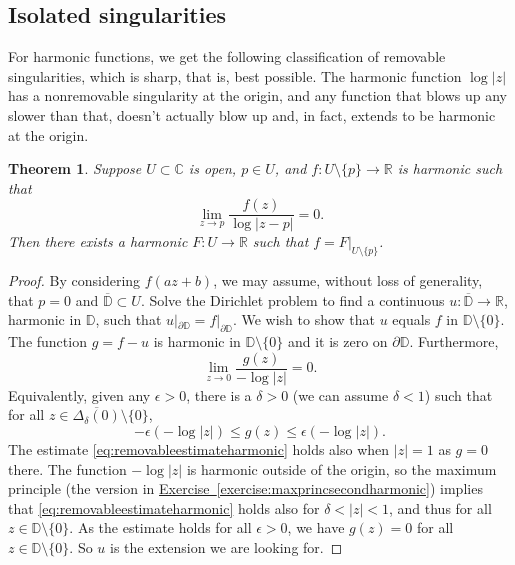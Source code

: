 \documentclass[12pt,openany]{book}
\newcommand{\sabs}[1]{\lvert {#1} \rvert}
\newcommand{\C}{{\mathbb{C}}}
\newcommand{\R}{{\mathbb{R}}}
\newcommand{\D}{{\mathbb{D}}}
\theoremstyle{plain}
\newtheorem{thm}{Theorem}[section]
\theoremstyle{remark}
\theoremstyle{definition}
\theoremstyle{exercise}
\theoremstyle{example}
\newcommand{\exerciseref}[1]{\hyperref[#1]{Exercise~\ref*{#1}}}
\begin{document}
\subsection{Isolated singularities}

For harmonic functions, we get the following classification of removable
singularities, which is sharp, that is, best possible.
The harmonic function $\log \sabs{z}$
has a nonremovable singularity at the origin, and any function
that blows up any slower than that, doesn't actually blow up and, in fact,
extends to be
harmonic at the origin.

\begin{thm}
Suppose $U \subset \C$ is open, $p \in U$, and $f \colon U \setminus \{ p \}
\to \R$ is harmonic such that
\begin{equation*}
\lim_{z\to p} \frac{f(z)}{\log \sabs{z-p}} = 0 .
\end{equation*}
Then there exists a harmonic $F \colon U \to \R$ such that
$f = F|_{U \setminus \{ p \}}$.
\end{thm}

\begin{proof}
By considering $f(a z + b)$, we may assume, without loss of generality,
that $p = 0$ and $\overline{\D} \subset U$.  Solve the Dirichlet problem
to find a continuous $u \colon \overline{\D} \to \R$,
harmonic in $\D$, such that $u|_{\partial \D} = f|_{\partial \D}$.
We wish to show that $u$ equals $f$ in $\D \setminus \{0\}$.
The function
$g = f - u$ is harmonic in $\D \setminus \{ 0 \}$ and it is zero on
$\partial \D$.  Furthermore,
\begin{equation*}
\lim_{z \to 0} \frac{g(z)}{-\log \sabs{z}} = 0.
\end{equation*}
Equivalently, given any $\epsilon > 0$, there is a $\delta > 0$
(we can assume $\delta < 1$)
such that for all $z \in \overline{\Delta_\delta(0)} \setminus \{ 0 \}$,
\begin{equation} \label{eq:removableestimateharmonic}
-\epsilon (- \log\sabs{z})
\leq
g(z)
\leq
\epsilon (- \log\sabs{z}) .
\end{equation}
The estimate \eqref{eq:removableestimateharmonic} holds also when
$\sabs{z}=1$ as $g=0$ there.
The function $-\log\sabs{z}$ is harmonic outside of the origin, so
the maximum principle (the version in
\exerciseref{exercise:maxprincsecondharmonic}) implies that
\eqref{eq:removableestimateharmonic} holds also for $\delta < \sabs{z} < 1$,
and thus for all $z \in \D \setminus \{ 0 \}$.
As the estimate holds for all $\epsilon > 0$, we have $g(z) = 0$ for all
$z \in \D \setminus \{0\}$.  So $u$ is the extension we are looking for.
\end{proof}
\end{document}

